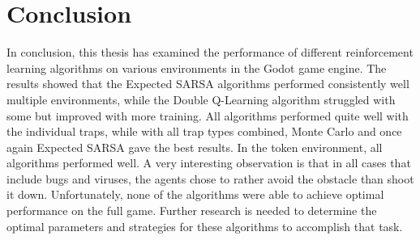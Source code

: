 \chapter*{Conclusion}

In conclusion, this thesis has examined the performance of different reinforcement learning algorithms on various environments in the Godot game engine.  The results showed that the Expected SARSA algorithms performed consistently well multiple environments, while the Double Q-Learning algorithm struggled with some but improved with more training. All algorithms performed quite well with the individual traps, while with all trap types combined, Monte Carlo and once again Expected SARSA gave the best results. In the token environment, all algorithms performed well. A very interesting observation is that in all cases that include bugs and viruses, the agents chose to rather avoid the obstacle than shoot it down. Unfortunately, none of the algorithms were able to achieve optimal performance on the full game. Further research is needed to determine the optimal parameters and strategies for these algorithms to accomplish that task.